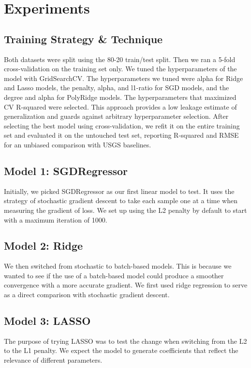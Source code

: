 
\section{Experiments}
\label{sec:expts}

\subsection{Training Strategy \& Technique}
Both datasets were split using the 80-20 train/test split. Then we ran a 5-fold cross-validation on the training set only. We tuned the hyperparameters of the model with GridSearchCV. The hyperparameters we tuned were alpha for Ridge and Lasso models, the penalty, alpha, and l1-ratio for SGD models, and the degree and alpha for PolyRidge models. The hyperparameters that maximized CV R-squared were selected. This approach provides a low leakage estimate of generalization and guards against arbitrary hyperparameter selection. After selecting the best model using cross-validation, we refit it on the entire training set and evaluated it on the untouched test set, reporting R-squared and RMSE for an unbiased comparison with USGS baselines.

\subsection{Model 1: SGDRegressor}
Initially, we picked SGDRegressor as our first linear model to test. It uses the strategy of stochastic gradient descent to take each sample one at a time when measuring the gradient of loss. We set up using the L2 penalty by default to start with a maximum iteration of 1000.

\subsection{Model 2: Ridge}
We then switched from stochastic to batch-based models. This is because we wanted to see if the use of a batch-based model could produce a smoother convergence with a more accurate gradient. We first used ridge regression to serve as a direct comparison with stochastic gradient descent.

\subsection{Model 3: LASSO}
The purpose of trying LASSO was to test the change when switching from the L2 to the L1 penalty. We expect the model to generate coefficients that reflect the relevance of different parameters.

